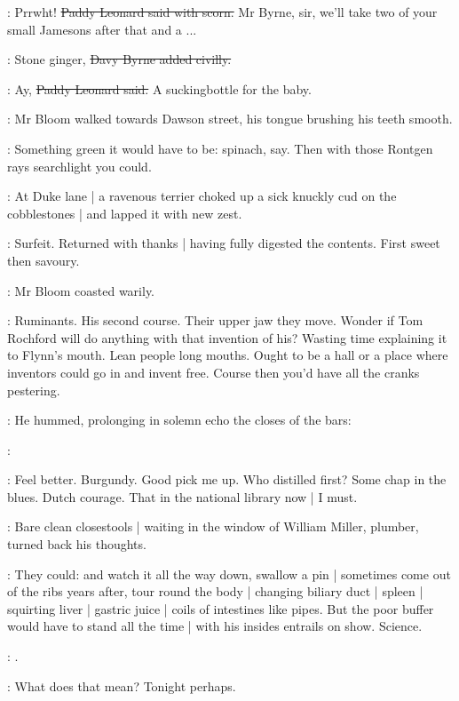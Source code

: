 \leonard:
Prrwht!
\sout{Paddy Leonard said with scorn.}
Mr Byrne, sir,
we'll take two of your small Jamesons after that and a ...

\davybyrne:
Stone ginger,
\sout{Davy Byrne added civilly.}

\leonard:
Ay,
\sout{Paddy Leonard said.}
A suckingbottle for the baby.

:
Mr Bloom walked towards Dawson street,
his tongue brushing his teeth smooth.

\BloomInt:
Something green it would have to be:
spinach, say.
Then with those Rontgen rays searchlight
you could.

:
At Duke lane |
a ravenous terrier choked up a sick knuckly cud on the cobblestones |
and lapped it with new zest.

\BloomInt:
Surfeit.
Returned with thanks |
having fully digested the contents.
First sweet then savoury.

:
Mr Bloom coasted warily.

\BloomInt:
Ruminants.
His second course.
Their upper jaw they move.
Wonder if Tom Rochford will do anything with that invention of his?
Wasting time explaining it to Flynn's mouth.
Lean people long mouths.
Ought to be a hall or a place where inventors could go in and invent free.
Course then you'd have all the cranks pestering.

:
He hummed,
prolonging in solemn echo the closes of the bars:

\Bloom:


\BloomInt:
Feel better.
Burgundy.
Good pick me up.
Who distilled first?
Some chap in the blues.
Dutch courage.
That  in the national library now |
I must.

:
Bare clean closestools |
waiting in the window of William Miller, plumber,
turned back his thoughts.

\BloomInt:
They could:
and watch it all the way down,
swallow a pin |
sometimes come out of the ribs years after,
tour round the body |
changing biliary duct |
spleen |
squirting liver |
gastric juice |
coils of intestines like pipes.
But the poor buffer
would have to stand all the time |
with his insides entrails on show.
Science.

\Bloom:
.

\BloomInt:
What does that  mean?
Tonight perhaps.

